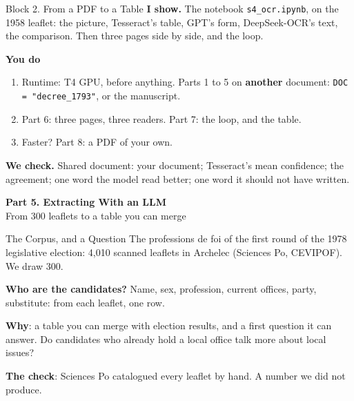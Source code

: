 \documentclass[svgnames,x11names,dvipsnames]{beamer}
\newcommand{\new}[1]{#1}
\newcommand{\sectionslide}[2]{%
\begin{frame}[plain]
  \centering
  \vfill
  {\LARGE \textbf{\textcolor{titleblue}{#1}}}\\[0.4cm]
  {#2}
  \vfill
\end{frame}}
\begin{document}
\begin{frame}{\new{Block 2. From a PDF to a Table}}
\small
\textbf{I show.} The notebook \texttt{s4\_ocr.ipynb}, on the 1958 leaflet: the picture, Tesseract's table, GPT's form, DeepSeek-OCR's text, the comparison. \new{Then three pages side by side}, and the loop.

\vspace{0.3cm}
\textbf{You do}
\begin{enumerate}
    \setlength{\itemsep}{3pt}
    \item \new{Runtime: T4 GPU, before anything.} Parts 1 to 5 on \textbf{another} document: \texttt{DOC = "decree\_1793"}, or the manuscript.
    \item Part 6: three pages, three readers. Part 7: the loop, and the table.
    \item Faster? Part 8: a PDF of your own.
\end{enumerate}

\vspace{0.3cm}
\textbf{We check.} Shared document: your document; Tesseract's mean confidence; the agreement; one word the model read better; one word it should not have written.
\end{frame}

\sectionslide{Part 5. Extracting With an LLM}{From 300 leaflets to a table you can merge}

\begin{frame}{\new{The Corpus, and a Question}}
\small
The professions de foi of the first round of the 1978 legislative election: 4,010 scanned leaflets in Archelec (Sciences Po, CEVIPOF). We draw 300.

\vspace{0.4cm}
\textbf{Who are the candidates?} Name, sex, profession, current offices, party, substitute: from each leaflet, one row.

\vspace{0.4cm}
\textbf{Why}: a table you can merge with election results, and a first question it can answer. Do candidates who already hold a local office talk more about local issues?

\vspace{0.4cm}
\textbf{The check}: Sciences Po catalogued every leaflet by hand. A number we did not produce.
\end{frame}
\end{document}
